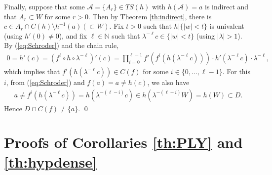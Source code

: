 \documentclass[a4paper,12pt]{amsart}
\theoremstyle{plain}
\theoremstyle{definition}
\theoremstyle{remark}
\numberwithin{equation}{section}
\begin{document}
Finally, suppose that some $\mathcal{A}=\{A_r\}\in{\mathit{TS}}(h)$ 
with $h(\mathcal{A})=a$ is indirect 
and that $A_r\subset W$ for some $r>0$.
Then by Theorem \ref{th:indirect},
there is $c\in A_r\cap C(h)\setminus h^{-1}(a)(\subset W)$.
Fix $t>0$ such that $h|\{|w|<t\}$ is univalent (using $h'(0)\neq 0$),
and fix $\ell\in{\mathbb{N}}$ such that $\lambda^{-\ell}c\in\{|w|<t\}$ 
(using $|\lambda|>1$).
By (\ref{eq:Schroder}) and the chain rule,
\begin{gather*}
 0=h'(c)=(f^{\ell}\circ h\circ\lambda^{-\ell})'(c)
  =\prod_{i=0}^{\ell-1}f'(f^i(h(\lambda^{-\ell}c)))\cdot h'(\lambda^{-\ell}c)\cdot\lambda^{-\ell},
\end{gather*} 
which implies that $f^i(h(\lambda^{-\ell}c))\in C(f)$ for some $i\in\{0,\ldots,\ell-1\}$. 
For this $i$, from (\ref{eq:Schroder}) and $f(a)=a\neq h(c)$, we also have
\begin{gather*}
  a\neq f^i(h(\lambda^{-\ell}c))
 =h(\lambda^{-(\ell-i)}c)\in h(\lambda^{-(\ell-i)}W)=h(W)\subset D.
\end{gather*} 
Hence $D\cap C(f)\neq\{a\}$.
\qed

\section{Proofs of Corollaries \ref{th:PLY} and \ref{th:hypdense}}\label{sec:example}
\end{document}
